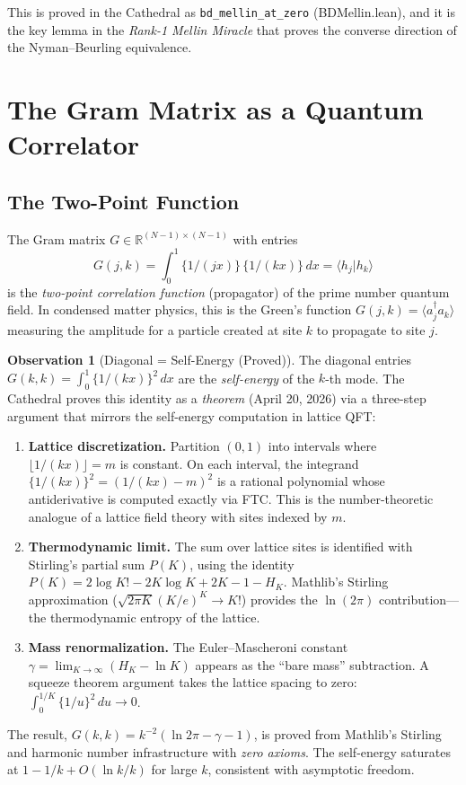 \documentclass[11pt,a4paper]{article}
\theoremstyle{definition}
\newtheorem{observation}[definition]{Observation}
\newcommand{\RR}{\mathbb{R}}
\newcommand{\fract}[1]{\{#1\}}
\newcommand{\lean}[1]{\texttt{#1}}
\newcommand{\braket}[2]{\langle #1 | #2 \rangle}
\newcommand{\expect}[1]{\langle #1 \rangle}
\begin{document}
This is proved in the Cathedral as \lean{bd\_mellin\_at\_zero} (BDMellin.lean),
and it is the key lemma in the \emph{Rank-1 Mellin Miracle} that proves
the converse direction of the Nyman--Beurling equivalence.

\section{The Gram Matrix as a Quantum Correlator}

\subsection{The Two-Point Function}

The Gram matrix $G \in \RR^{(N-1) \times (N-1)}$ with entries
\[
  G(j,k) = \int_0^1 \fract{1/(jx)}\,\fract{1/(kx)}\,dx
  = \braket{h_j}{h_k}
\]
is the \emph{two-point correlation function} (propagator) of the
prime number quantum field. In condensed matter physics, this is the
Green's function $G(j,k) = \expect{a_j^\dagger a_k}$ measuring the
amplitude for a particle created at site $k$ to propagate to site $j$.

\begin{observation}[Diagonal = Self-Energy (Proved)]
The diagonal entries $G(k,k) = \int_0^1 \fract{1/(kx)}^2\,dx$ are
the \emph{self-energy} of the $k$-th mode. The Cathedral proves
this identity as a \emph{theorem} (April 20, 2026) via a three-step
argument that mirrors the self-energy computation in lattice QFT:
\begin{enumerate}
  \item \textbf{Lattice discretization.} Partition $(0,1)$ into intervals
    where $\lfloor 1/(kx) \rfloor = m$ is constant. On each interval,
    the integrand $\fract{1/(kx)}^2 = (1/(kx) - m)^2$ is a rational
    polynomial whose antiderivative is computed exactly via FTC.
    This is the number-theoretic analogue of a lattice field theory
    with sites indexed by $m$.
  \item \textbf{Thermodynamic limit.} The sum over lattice sites is
    identified with Stirling's partial sum $P(K)$, using the identity
    $P(K) = 2\log K! - 2K\log K + 2K - 1 - H_K$.
    Mathlib's Stirling approximation ($\sqrt{2\pi K}(K/e)^K \to K!$)
    provides the $\ln(2\pi)$ contribution---the thermodynamic
    entropy of the lattice.
  \item \textbf{Mass renormalization.} The Euler--Mascheroni constant
    $\gamma = \lim_{K\to\infty}(H_K - \ln K)$ appears as the ``bare
    mass'' subtraction. A squeeze theorem argument takes the lattice
    spacing to zero: $\int_0^{1/K} \fract{1/u}^2\,du \to 0$.
\end{enumerate}
The result, $G(k,k) = k^{-2}(\ln 2\pi - \gamma - 1)$, is proved from
Mathlib's Stirling and harmonic number infrastructure with \emph{zero
axioms}. The self-energy saturates at $1 - 1/k + O(\ln k / k)$ for
large $k$, consistent with asymptotic freedom.
\end{observation}
\end{document}
